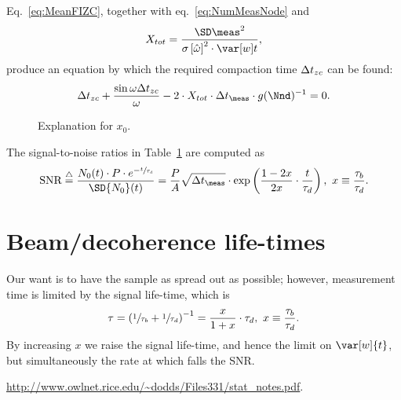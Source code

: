 \documentclass{article}
\newcommand{\dt}{\Delta t}
\newcommand{\dtm}{\dt_{\meas}}
\newcommand{\LTb}{\tau_b}
\newcommand{\LTd}{\tau_d}
\begin{document}
Eq.~\eqref{eq:MeanFIZC}, together with eq.~\eqref{eq:NumMeasNode} and
\[
	\stat* = \stat,
\]
produce an equation by which the required compaction time $\dtnd$ can be found:
\begin{equation}\label{eq:CmpTEq}
	\dtnd + \frac{\sin\omega\dtnd}{\omega} - 2\cdot \stat* \cdot\dtm \cdot g(\Nnd)^{-1}= 0.
\end{equation}

\begin{figure}[h]
	\centering
	\caption{Explanation for $x_0$\label{fig:x0Expl}.}
\end{figure}

\newcommand{\SNR}{\text{SNR}}
\newcommand{\deq}{\overset{\triangle}{=}}
The signal-to-noise ratios in Table~\ref{fig:x0Expl} are computed as 
\begin{equation}\label{eq:TauRatioSNR}
	\SNR \deq \frac{N_0(t)\cdot P\cdot e^{-\sfrac{t}{\LTd}}}{\SD{N_0}(t)} 
	= \frac{P}{A}\sqrt{\dtm}\cdot\exp\bkt{\frac{1-2x}{2x}\cdot\frac{t}{\LTd}},~ x\equiv \frac{\LTb}{\LTd}.
\end{equation}

\section{Beam/decoherence life-times}

Our want is to have the sample as spread out as possible; however, measurement time is limited by the signal life-time, which is 
\[
	\tau = \bkt{\sfrac{1}{\LTb} + \sfrac{1}{\LTd}}^{-1} = \frac{x}{1+x}\cdot \LTd,~ x \equiv \frac{\LTb}{\LTd}.
\]
By increasing $x$ we raise the signal life-time, and hence the limit on $\var[w]{t}$, but simultaneously the rate at which falls the SNR.


\begin{thebibliography}{9}
	\url{http://www.owlnet.rice.edu/~dodds/Files331/stat_notes.pdf}.
\end{thebibliography}
\end{document}
